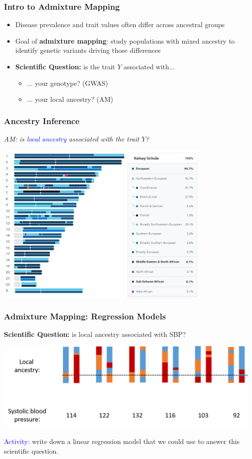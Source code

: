 \documentclass[12pt, 
hyperref={colorlinks=true, linkcolor=blue, urlcolor=cyan},dvipsnames]{beamer}
\begin{document}
\begin{frame}
\frametitle{Intro to Admixture Mapping}

\begin{itemize}
\item Disease prevalence and trait values often differ across ancestral groups
\item Goal of \textbf{admixture mapping}: study populations with mixed ancestry to identify genetic variants driving those differences \pause
\item \textbf{Scientific Question:} is the trait $Y$ associated with...
	\begin{itemize}
	\item ... your genotype? (GWAS) \pause
	\item ... your local ancestry? (AM)
	\end{itemize}
\end{itemize}

\end{frame}

\begin{frame}
\frametitle{Ancestry Inference}
\centering

\textit{AM: is \textcolor{blue}{local ancestry} associated with the trait $Y$?} \pause

\includegraphics[width=0.8\textwidth]{figs/lai_example_23andMe}

\end{frame}


\begin{frame}
\frametitle{Admixture Mapping: Regression Models}

\textbf{Scientific Question:} is local ancestry associated with SBP?

\includegraphics[width=\textwidth]{figs/am_k3}

\textcolor{blue}{Activity:} write down a linear regression model that we could use to answer this scientific question.

\end{frame}
\end{document}
